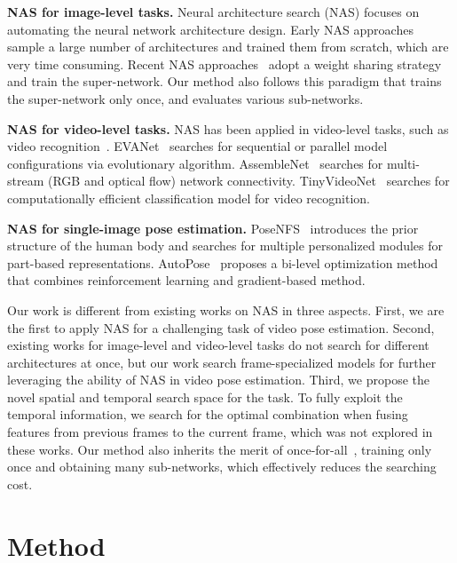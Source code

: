\documentclass[final]{cvpr}
\begin{document}
\textbf{NAS for image-level tasks.}
Neural architecture search (NAS) focuses on automating the neural network architecture design. Early NAS approaches~\cite{liu2018progressive,real2019regularized,tan2019mnasnet,zoph2016neural,zoph2018learning} sample a large number of architectures and trained them from scratch, which are very time consuming. Recent NAS approaches~\cite{cai2020once,cai2018proxylessnas,li2020improving,liang2019computation,liu2018darts,liu2020inception,liu2020block,wu2019fbnet,yu2020bignas,zhou2020econas} adopt a weight sharing strategy and train the super-network. Our method also follows this paradigm that trains the super-network only once, and evaluates various sub-networks.

\textbf{NAS for video-level tasks.} 
NAS has been applied in video-level tasks, such as video recognition~\cite{peng2019video,piergiovanni2019tiny,piergiovanni2019evolving,ryoo2019assemblenet}. EVANet~\cite{piergiovanni2019evolving} searches for sequential or parallel model configurations via evolutionary algorithm. AssembleNet~\cite{ryoo2019assemblenet} searches for multi-stream (RGB and optical flow) network connectivity. TinyVideoNet~\cite{piergiovanni2019tiny} searches for computationally efficient classification model for video recognition. 

\textbf{NAS for single-image pose estimation.}
PoseNFS~\cite{yang2019pose} introduces the prior structure of the human body and searches for multiple personalized modules for part-based representations. 
AutoPose~\cite{gong2020autopose} proposes a bi-level optimization method that combines reinforcement learning and gradient-based method.

Our work is different from existing works on NAS in three aspects. First, we are the first to apply NAS for a challenging task of video pose estimation. Second, existing works for image-level and video-level tasks do not search for different architectures at once, but our work search frame-specialized models for further leveraging the ability of NAS in video pose estimation. 
Third, we propose the novel spatial and temporal search space for the task. To fully exploit the temporal information, we search for the optimal combination when fusing features from previous frames to the current frame, which was not explored in these works. Our method also inherits the merit of once-for-all~\cite{cai2020once}, \ie training only once and obtaining many sub-networks, which effectively reduces the searching cost. 

\section{Method}
\end{document}
